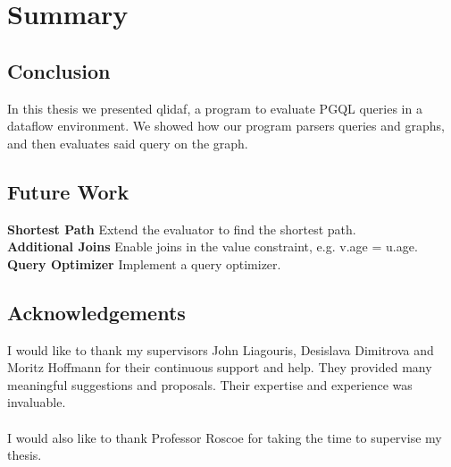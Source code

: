 \documentclass[11pt,singlecolumn]{scrartcl}
\begin{document}
\section{Summary}

\subsection{Conclusion}
In this thesis we presented qlidaf, a program to evaluate PGQL queries in a dataflow environment. We showed how our program parsers queries and graphs, and then evaluates said query on the graph.
\subsection{Future Work}
\textbf{Shortest Path} \quad Extend the evaluator to find the shortest path.\\
\textbf{Additional Joins} \quad Enable joins in the value constraint, e.g. v.age = u.age.\\
\textbf{Query Optimizer} \quad Implement a query optimizer.
\subsection{Acknowledgements}
I would like to thank my supervisors John Liagouris, Desislava Dimitrova and Moritz Hoffmann for their continuous support and help. They provided many meaningful suggestions and proposals. Their expertise and experience was invaluable.\\\\
I would also like to thank Professor Roscoe for taking the time to supervise my thesis.

\clearpage


{}

\end{document}
